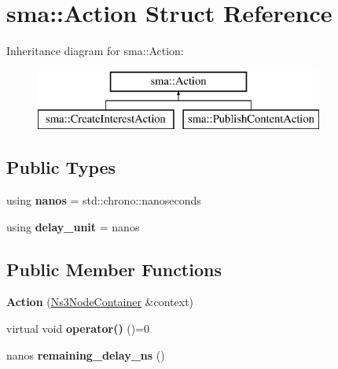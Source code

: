 \hypertarget{structsma_1_1Action}{\section{sma\-:\-:Action Struct Reference}
\label{structsma_1_1Action}
}
Inheritance diagram for sma\-:\-:Action\-:\begin{figure}[H]
\begin{center}
\leavevmode
\includegraphics[height=2.000000cm]{structsma_1_1Action}
\end{center}
\end{figure}
\subsection*{Public Types}
\begin{DoxyCompactItemize}
\item 
\hypertarget{structsma_1_1Action_abcfa737ef02486538edcc5df649b0392}{using {\bfseries nanos} = std\-::chrono\-::nanoseconds}\label{structsma_1_1Action_abcfa737ef02486538edcc5df649b0392}

\item 
\hypertarget{structsma_1_1Action_a3f00650e4dc9cdcadfb31ffc02fbc5a5}{using {\bfseries delay\-\_\-unit} = nanos}\label{structsma_1_1Action_a3f00650e4dc9cdcadfb31ffc02fbc5a5}

\end{DoxyCompactItemize}
\subsection*{Public Member Functions}
\begin{DoxyCompactItemize}
\item 
\hypertarget{structsma_1_1Action_a7eaa3415defd12f4ab8720009499097e}{{\bfseries Action} (\hyperlink{classsma_1_1Ns3NodeContainer}{Ns3\-Node\-Container} \&context)}\label{structsma_1_1Action_a7eaa3415defd12f4ab8720009499097e}

\item 
\hypertarget{structsma_1_1Action_a5bb8f22a7e77cdf7c8cfd3fee7d90c09}{virtual void {\bfseries operator()} ()=0}\label{structsma_1_1Action_a5bb8f22a7e77cdf7c8cfd3fee7d90c09}

\item 
\hypertarget{structsma_1_1Action_a8cdbc5cbd2733992376eab1538cb2874}{nanos {\bfseries remaining\-\_\-delay\-\_\-ns} ()}\label{structsma_1_1Action_a8cdbc5cbd2733992376eab1538cb2874}

\end{DoxyCompactItemize}
